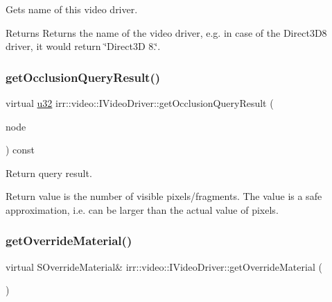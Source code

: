 Gets name of this video driver. 

\begin{DoxyReturn}{Returns}
Returns the name of the video driver, e.\+g. in case of the Direct3\+D8 driver, it would return \char`\"{}\+Direct3\+D 8.\char`\"{}. 
\end{DoxyReturn}
\mbox{\label{classirr_1_1video_1_1IVideoDriver_a149ea92e04b2d0fe18bf5b584ccf6de4}} 
\subsubsection{\texorpdfstring{get\+Occlusion\+Query\+Result()}{getOcclusionQueryResult()}}
{\footnotesize\ttfamily virtual \hyperlink{namespaceirr_a0416a53257075833e7002efd0a18e804}{u32} irr\+::video\+::\+I\+Video\+Driver\+::get\+Occlusion\+Query\+Result (\begin{DoxyParamCaption}\item[{\hyperlink{classirr_1_1scene_1_1ISceneNode}{scene\+::\+I\+Scene\+Node} $\ast$}]{node }\end{DoxyParamCaption}) const\hspace{0.3cm}{\ttfamily [pure virtual]}}



Return query result. 

Return value is the number of visible pixels/fragments. The value is a safe approximation, i.\+e. can be larger than the actual value of pixels. \mbox{\label{classirr_1_1video_1_1IVideoDriver_af119ebfd02f99f77a463007277abf14a}} 
\subsubsection{\texorpdfstring{get\+Override\+Material()}{getOverrideMaterial()}}
{\footnotesize\ttfamily virtual S\+Override\+Material\& irr\+::video\+::\+I\+Video\+Driver\+::get\+Override\+Material (\begin{DoxyParamCaption}{ }\end{DoxyParamCaption})\hspace{0.3cm}{\ttfamily [pure virtual]}}



